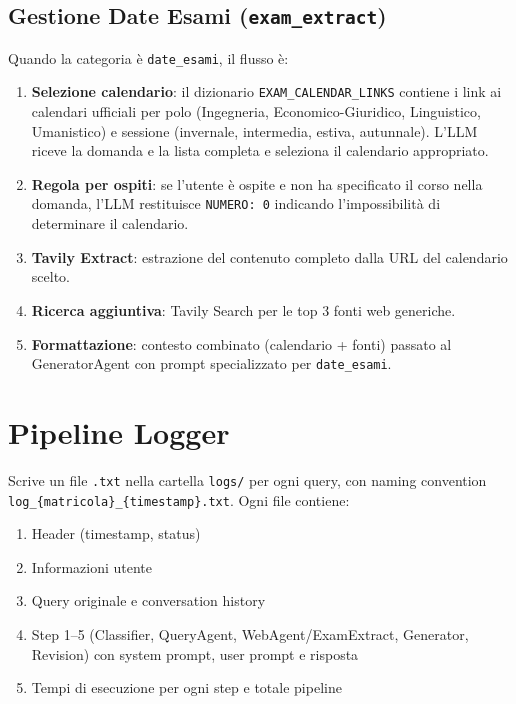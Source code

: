\documentclass[a4paper,12pt]{report}
\begin{document}
\subsection{Gestione Date Esami (\texttt{exam\_extract})}

Quando la categoria è \texttt{date\_esami}, il flusso è:

\begin{enumerate}
    \item \textbf{Selezione calendario}: il dizionario \texttt{EXAM\_CALENDAR\_LINKS} contiene i link ai calendari ufficiali per polo (Ingegneria, Economico-Giuridico, Linguistico, Umanistico) e sessione (invernale, intermedia, estiva, autunnale). L'LLM riceve la domanda e la lista completa e seleziona il calendario appropriato.
    \item \textbf{Regola per ospiti}: se l'utente è ospite e non ha specificato il corso nella domanda, l'LLM restituisce \texttt{NUMERO: 0} indicando l'impossibilità di determinare il calendario.
    \item \textbf{Tavily Extract}: estrazione del contenuto completo dalla URL del calendario scelto.
    \item \textbf{Ricerca aggiuntiva}: Tavily Search per le top 3 fonti web generiche.
    \item \textbf{Formattazione}: contesto combinato (calendario + fonti) passato al GeneratorAgent con prompt specializzato per \texttt{date\_esami}.
\end{enumerate}

\section{Pipeline Logger}

Scrive un file \texttt{.txt} nella cartella \texttt{logs/} per ogni query, con naming convention \texttt{log\_\{matricola\}\_\{timestamp\}.txt}. Ogni file contiene:
\begin{enumerate}
    \item Header (timestamp, status)
    \item Informazioni utente
    \item Query originale e conversation history
    \item Step 1--5 (Classifier, QueryAgent, WebAgent/ExamExtract, Generator, Revision) con system prompt, user prompt e risposta
    \item Tempi di esecuzione per ogni step e totale pipeline
\end{enumerate}
\end{document}
